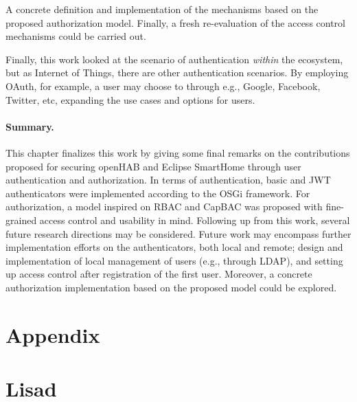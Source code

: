 \documentclass[12pt]{article}
\renewcommand{\refname}{Viidatud kirjandus}%
\renewcommand{\appendixname}{Lisad}%
\begin{document}
A concrete definition and implementation of the mechanisms based on the proposed authorization model. Finally, a fresh re-evaluation of the access control mechanisms could be carried out.

Finally, this work looked at the scenario of authentication \emph{within} the ecosystem, but as Internet of Things, there are other authentication scenarios. By employing OAuth, for example, a user may choose to through e.g., Google, Facebook, Twitter, etc, expanding the use cases and options for users.

\paragraph{Summary.} This chapter finalizes this work by giving some final remarks on the contributions proposed for securing openHAB and Eclipse SmartHome through user authentication and authorization. In terms of authentication, basic and JWT authenticators were implemented according to the OSGi framework. For authorization, a model inspired on RBAC and CapBAC was proposed with fine-grained access control and usability in mind. Following up from this work, several future research directions may be considered. Future work may encompass further implementation efforts on the authenticators, both local and remote; design and implementation of local management of users (e.g., through LDAP), and setting up access control after registration of the first user. Moreover, a concrete authorization implementation based on the proposed model could be explored. 

\newpage



\addcontentsline{toc}{section}{\refname}



\newpage
%
  {\section*{Appendix}
  }%
  {\section*{Lisad}
  }
  
\end{document}
